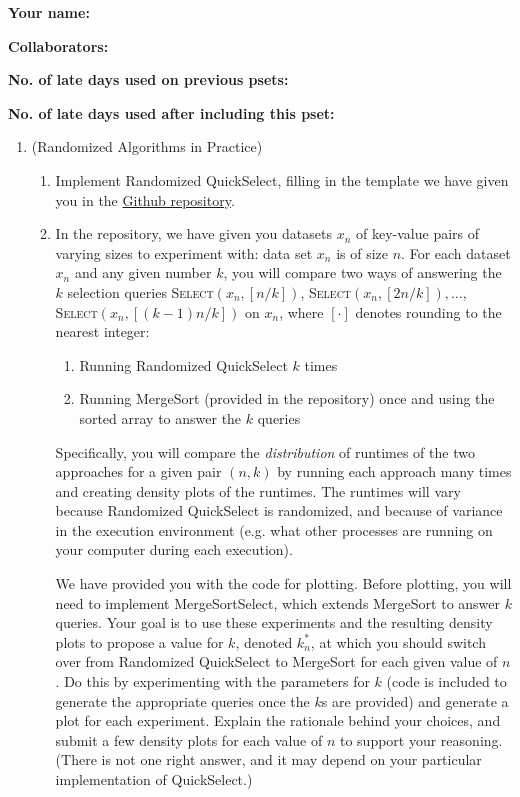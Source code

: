 \documentclass[11pt]{article}
\begin{document}


\textbf{Your name: }

\textbf{Collaborators: }

\textbf{No. of late days used on previous psets: }

\textbf{No. of late days used after including this pset: }

\begin{enumerate}
    \item (Randomized Algorithms in Practice)  
    \begin{enumerate}
        \item Implement Randomized QuickSelect, filling in the template we have given you in the \href{https://github.com/Harvard-CS-120/cs120/tree/main/fall2023/psets}{Github repository}.  

        \item 
        In the repository, we have given you datasets $x_n$ of
        key-value pairs of varying sizes to experiment with: data set $x_n$ is of size $n$.  For each dataset $x_n$ and any given number $k$, you will compare two ways of answering the $k$ selection queries
        \textsc{Select}$(x_n,[n/k])$, \textsc{Select}$(x_n,[2n/k]), \ldots$, \textsc{Select}$(x_n,[(k-1)n/k])$ on $x_n$, where $[\cdot]$ denotes rounding to the nearest integer:
        \begin{enumerate}
            \item Running Randomized QuickSelect $k$ times
            \item Running MergeSort (provided in the repository) once and using the sorted array to answer the $k$ queries
        \end{enumerate}
        Specifically, you will compare the {\em distribution} of runtimes of the two approaches for a given pair $(n,k)$ by running each approach many times and creating density plots of the runtimes.  The runtimes will vary because Randomized QuickSelect  is randomized, and because of variance in the execution environment (e.g. what other processes are running on your computer during each execution). \vspace{1.5mm}
        
        We have provided you with the code for plotting. Before plotting, you will need to implement MergeSortSelect, which extends MergeSort to answer $k$ queries. Your goal is to use these experiments and the resulting density plots to propose a value for $k$, denoted $k^*_n$, at which you should switch over from Randomized QuickSelect to MergeSort for each given value of $n$. Do this by experimenting with the parameters for $k$ (code is included to generate the appropriate queries once the $k$s are provided) and generate a plot for each experiment.  Explain the rationale behind your choices, and submit a few density plots for each value of $n$ to support your reasoning.  (There is not one right answer, and it may depend on your particular implementation of QuickSelect.) 


\end{enumerate}
\end{enumerate}
\end{document}
